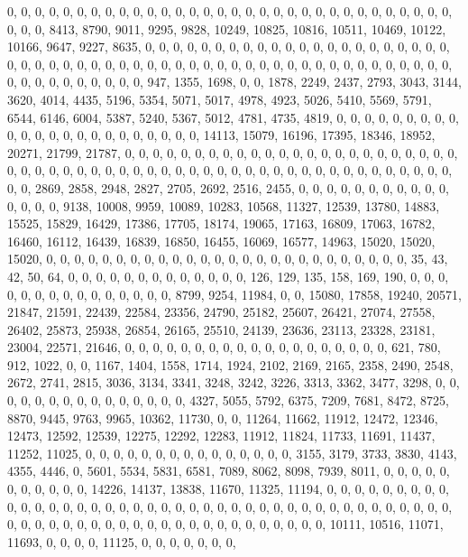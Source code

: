 \documentclass[
]{article}
\begin{document}
0, 0, 0, 0, 0, 0, 0, 0, 0, 0, 0, 0, 0, 0, 0, 0, 0, 0, 0, 0, 0, 0, 0, 0,
0, 0, 0, 0, 0, 0, 0, 0, 0, 0, 0, 8413, 8790, 9011, 9295, 9828, 10249,
10825, 10816, 10511, 10469, 10122, 10166, 9647, 9227, 8635, 0, 0, 0, 0,
0, 0, 0, 0, 0, 0, 0, 0, 0, 0, 0, 0, 0, 0, 0, 0, 0, 0, 0, 0, 0, 0, 0, 0,
0, 0, 0, 0, 0, 0, 0, 0, 0, 0, 0, 0, 0, 0, 0, 0, 0, 0, 0, 0, 0, 0, 0, 0,
0, 0, 0, 0, 0, 0, 0, 0, 0, 0, 0, 0, 947, 1355, 1698, 0, 0, 1878, 2249,
2437, 2793, 3043, 3144, 3620, 4014, 4435, 5196, 5354, 5071, 5017, 4978,
4923, 5026, 5410, 5569, 5791, 6544, 6146, 6004, 5387, 5240, 5367, 5012,
4781, 4735, 4819, 0, 0, 0, 0, 0, 0, 0, 0, 0, 0, 0, 0, 0, 0, 0, 0, 0, 0,
0, 0, 0, 0, 0, 14113, 15079, 16196, 17395, 18346, 18952, 20271, 21799,
21787, 0, 0, 0, 0, 0, 0, 0, 0, 0, 0, 0, 0, 0, 0, 0, 0, 0, 0, 0, 0, 0, 0,
0, 0, 0, 0, 0, 0, 0, 0, 0, 0, 0, 0, 0, 0, 0, 0, 0, 0, 0, 0, 0, 0, 0, 0,
0, 0, 0, 0, 0, 0, 0, 0, 0, 0, 0, 0, 2869, 2858, 2948, 2827, 2705, 2692,
2516, 2455, 0, 0, 0, 0, 0, 0, 0, 0, 0, 0, 0, 0, 0, 0, 0, 9138, 10008,
9959, 10089, 10283, 10568, 11327, 12539, 13780, 14883, 15525, 15829,
16429, 17386, 17705, 18174, 19065, 17163, 16809, 17063, 16782, 16460,
16112, 16439, 16839, 16850, 16455, 16069, 16577, 14963, 15020, 15020,
15020, 0, 0, 0, 0, 0, 0, 0, 0, 0, 0, 0, 0, 0, 0, 0, 0, 0, 0, 0, 0, 0, 0,
0, 0, 0, 0, 35, 43, 42, 50, 64, 0, 0, 0, 0, 0, 0, 0, 0, 0, 0, 0, 0, 0,
126, 129, 135, 158, 169, 190, 0, 0, 0, 0, 0, 0, 0, 0, 0, 0, 0, 0, 0, 0,
0, 8799, 9254, 11984, 0, 0, 15080, 17858, 19240, 20571, 21847, 21591,
22439, 22584, 23356, 24790, 25182, 25607, 26421, 27074, 27558, 26402,
25873, 25938, 26854, 26165, 25510, 24139, 23636, 23113, 23328, 23181,
23004, 22571, 21646, 0, 0, 0, 0, 0, 0, 0, 0, 0, 0, 0, 0, 0, 0, 0, 0, 0,
0, 0, 621, 780, 912, 1022, 0, 0, 1167, 1404, 1558, 1714, 1924, 2102,
2169, 2165, 2358, 2490, 2548, 2672, 2741, 2815, 3036, 3134, 3341, 3248,
3242, 3226, 3313, 3362, 3477, 3298, 0, 0, 0, 0, 0, 0, 0, 0, 0, 0, 0, 0,
0, 0, 0, 4327, 5055, 5792, 6375, 7209, 7681, 8472, 8725, 8870, 9445,
9763, 9965, 10362, 11730, 0, 0, 11264, 11662, 11912, 12472, 12346,
12473, 12592, 12539, 12275, 12292, 12283, 11912, 11824, 11733, 11691,
11437, 11252, 11025, 0, 0, 0, 0, 0, 0, 0, 0, 0, 0, 0, 0, 0, 0, 0, 3155,
3179, 3733, 3830, 4143, 4355, 4446, 0, 5601, 5534, 5831, 6581, 7089,
8062, 8098, 7939, 8011, 0, 0, 0, 0, 0, 0, 0, 0, 0, 0, 0, 14226, 14137,
13838, 11670, 11325, 11194, 0, 0, 0, 0, 0, 0, 0, 0, 0, 0, 0, 0, 0, 0, 0,
0, 0, 0, 0, 0, 0, 0, 0, 0, 0, 0, 0, 0, 0, 0, 0, 0, 0, 0, 0, 0, 0, 0, 0,
0, 0, 0, 0, 0, 0, 0, 0, 0, 0, 0, 0, 0, 0, 0, 0, 0, 0, 0, 0, 0, 0, 0, 0,
0, 10111, 10516, 11071, 11693, 0, 0, 0, 0, 11125, 0, 0, 0, 0, 0, 0, 0,
\end{document}
